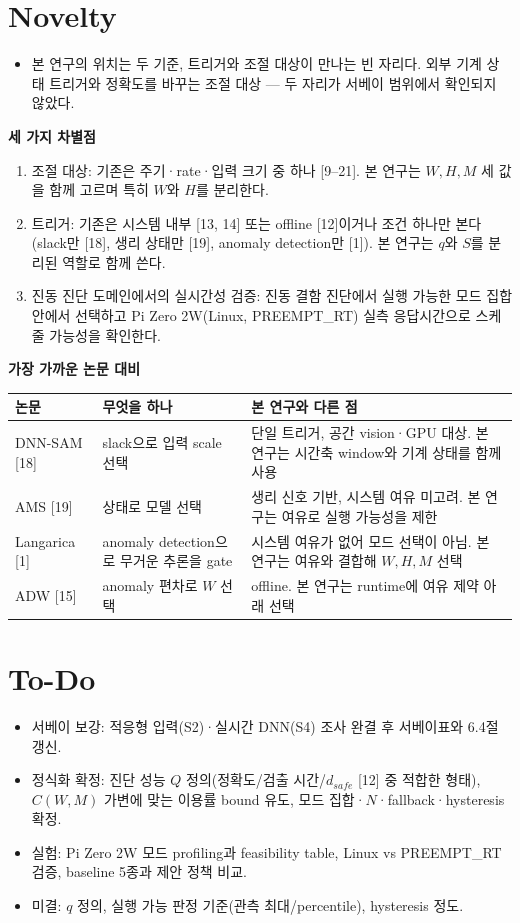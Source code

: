 \documentclass[10pt]{article}
\begin{document}
\section{Novelty}
\begin{itemize}
\item 본 연구의 위치는 두 기준, 트리거와 조절 대상이 만나는 빈 자리다. 외부 기계 상태 트리거와 정확도를 바꾸는 조절 대상 --- 두 자리가 서베이 범위에서 확인되지 않았다.
\end{itemize}
\noindent\textbf{세 가지 차별점}
\begin{enumerate}
\item 조절 대상: 기존은 주기·rate·입력 크기 중 하나 [9--21]. 본 연구는 $W,H,M$ 세 값을 함께 고르며 특히 $W$와 $H$를 분리한다.
\item 트리거: 기존은 시스템 내부 [13, 14] 또는 offline [12]이거나 조건 하나만 본다(slack만 [18], 생리 상태만 [19], anomaly detection만 [1]). 본 연구는 $q$와 $S$를 분리된 역할로 함께 쓴다.
\item 진동 진단 도메인에서의 실시간성 검증: 진동 결함 진단에서 실행 가능한 모드 집합 안에서 선택하고 Pi Zero 2W(Linux, PREEMPT\_RT) 실측 응답시간으로 스케줄 가능성을 확인한다.
\end{enumerate}
\noindent\textbf{가장 가까운 논문 대비}
\begin{center}\footnotesize
\begin{tabular}{@{}L{2.2cm}L{4.0cm}L{6.2cm}@{}}
\toprule
논문 & 무엇을 하나 & 본 연구와 다른 점 \\ \midrule
DNN-SAM [18] & slack으로 입력 scale 선택 & 단일 트리거, 공간 vision·GPU 대상. 본 연구는 시간축 window와 기계 상태를 함께 사용 \\
AMS [19] & 상태로 모델 선택 & 생리 신호 기반, 시스템 여유 미고려. 본 연구는 여유로 실행 가능성을 제한 \\
Langarica [1] & anomaly detection으로 무거운 추론을 gate & 시스템 여유가 없어 모드 선택이 아님. 본 연구는 여유와 결합해 $W,H,M$ 선택 \\
ADW [15] & anomaly 편차로 $W$ 선택 & offline. 본 연구는 runtime에 여유 제약 아래 선택 \\
\bottomrule
\end{tabular}
\end{center}

\section{To-Do}
\begin{itemize}
\item 서베이 보강: 적응형 입력(S2)·실시간 DNN(S4) 조사 완결 후 서베이표와 6.4절 갱신.
\item 정식화 확정: 진단 성능 $Q$ 정의(정확도/검출 시간/$d_{safe}$ [12] 중 적합한 형태), $C(W,M)$ 가변에 맞는 이용률 bound 유도, 모드 집합·$N$·fallback·hysteresis 확정.
\item 실험: Pi Zero 2W 모드 profiling과 feasibility table, Linux vs PREEMPT\_RT 검증, baseline 5종과 제안 정책 비교.
\item 미결: $q$ 정의, 실행 가능 판정 기준(관측 최대/percentile), hysteresis 정도.
\end{itemize}
\end{document}
